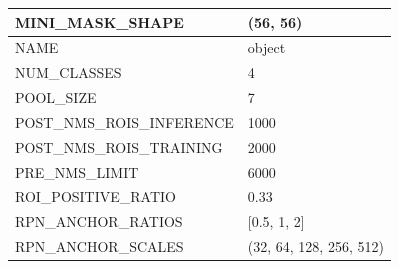 \begin{longtable}{|l|l|}
	MINI\_MASK\_SHAPE               & (56, 56)                                                                                                                                                                               \\ \hline
	NAME                            & object                                                                                                                                                                                 \\ \hline
	NUM\_CLASSES                    & 4                                                                                                                                                                                      \\ \hline
	POOL\_SIZE                      & 7                                                                                                                                                                                      \\ \hline
	POST\_NMS\_ROIS\_INFERENCE      & 1000                                                                                                                                                                                   \\ \hline
	POST\_NMS\_ROIS\_TRAINING       & 2000                                                                                                                                                                                   \\ \hline
	PRE\_NMS\_LIMIT                 & 6000                                                                                                                                                                                   \\ \hline
	ROI\_POSITIVE\_RATIO            & 0.33                                                                                                                                                                                   \\ \hline
	RPN\_ANCHOR\_RATIOS             & {[}0.5, 1, 2{]}                                                                                                                                                                        \\ \hline
	RPN\_ANCHOR\_SCALES             & (32, 64, 128, 256, 512)                                                                                                                                                                \\ \hline

\end{longtable}
